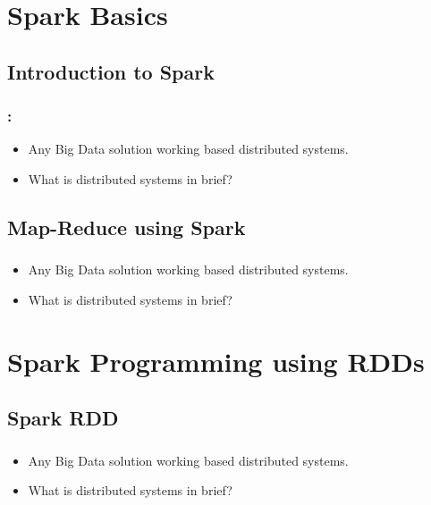 \section{Spark Basics}


\subsection{Introduction to Spark}
\begin{frame}
  \frametitle{\secname : \subsecname}
	\begin{itemize}[<+->]
		\item Any Big Data solution working based distributed systems.
		\item What is distributed systems in brief?
	\end{itemize}
\end{frame}

\subsection{Map-Reduce using Spark}
\begin{frame}
  \frametitle{\subsecname}
	\begin{itemize}[<+->]
		\item Any Big Data solution working based distributed systems.
		\item What is distributed systems in brief?
	\end{itemize}
\end{frame}

\section{Spark Programming using RDDs}
\subsection{Spark RDD}

\begin{frame}
  \frametitle{\subsecname}
	\begin{itemize}[<+->]
		\item Any Big Data solution working based distributed systems.
		\item What is distributed systems in brief?
	\end{itemize}
\end{frame}

